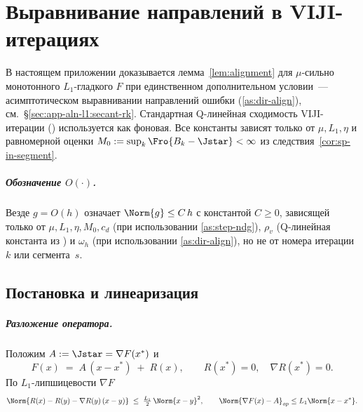 
\chapter{Выравнивание направлений в VIJI-итерациях}
\label{app:alignment}

В настоящем приложении доказывается лемма~\ref{lem:alignment} для
$\mu$-сильно монотонного $L_1$-гладкого $F$ при единственном
дополнительном условии~--- асимптотическом выравнивании
направлений ошибки \textup{(}\ref{as:dir-align}\textup{)},
см.~\S\ref{sec:app-aln-l1:secant-rk}. Стандартная Q-линейная сходимость
VIJI-итерации \textup{(}\cite[Theorem~3.4]{Agafonov2024VIJI}\textup{)}
используется как фоновая. Все константы зависят только от
$\mu, L_1, \eta$ и равномерной оценки $M_0 := \sup_k \Fro{B_k - \Jstar} <
\infty$ из следствия~\ref{cor:sp-in-segment}.

\paragraph{Обозначение $O(\cdot)$.}
Везде $g = O(h)$ означает $\Norm{g} \le C\,h$ с константой $C \ge 0$,
зависящей только от $\mu, L_1, \eta, M_0, c_d$ \textup{(}при использовании
\ref{as:step-ndg}\textup{)}, $\rho_v$ \textup{(}Q-линейная константа из
\cite[Theorem~3.4]{Agafonov2024VIJI}\textup{)} и $\omega_h$
\textup{(}при использовании \ref{as:dir-align}\textup{)}, но не от номера
итерации $k$ или сегмента~$s$.

\section{Постановка и линеаризация}
\label{sec:app-aln-l1:setup}

\paragraph{Разложение оператора.}
Положим $A := \Jstar = \nabla F(x^{*})$ и
\begin{equation}
F(x) \;=\; A\,(x - x^{*}) \;+\; R(x),
\qquad
R(x^{*}) = 0,
\quad
\nabla R(x^{*}) = 0.
\label{eq:app-aln-l1:decomp}
\end{equation}
По $L_1$-липшицевости $\nabla F$
\begin{equation}
\Norm{R(x) - R(y) - \nabla R(y)\,(x-y)} \;\le\; \tfrac{L_1}{2}\,\Norm{x-y}^{2},
\qquad
\Norm{\nabla F(x) - A}_{op} \le L_1\Norm{x-x^{*}}.
\label{eq:app-aln-l1:R-bounds}
\end{equation}

